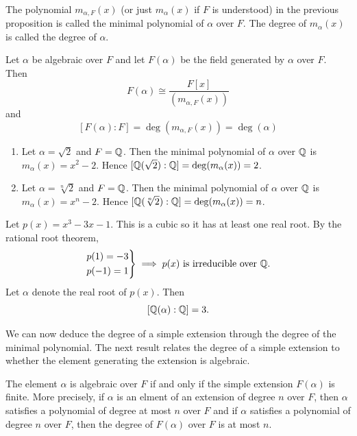 \begin{definition} \leavevmode \\
    The polynomial $m_{\alpha, F}(x)$ (or just $m_\alpha(x)$ if $F$ is understood) in the previous proposition is called the minimal polynomial of $\alpha$ over $F$. The degree of $m_\alpha (x)$ is called the degree of $\alpha$.
\end{definition}

\begin{proposition}
    Let $\alpha$ be algebraic over $F$ and let $F(\alpha)$ be the field generated by $\alpha$ over $F$. Then
    $$F(\alpha) \cong \frac{F[x]}{(m_{\alpha, F}(x))}$$
    and
    $$[F(\alpha) : F] = \deg (m_{\alpha, F}(x)) = \deg (\alpha)$$
\end{proposition}

\begin{example}
    \begin{enumerate}
        \item Let $\alpha = \sqrt{2}$ and $F = \mathbb{Q}$. Then the minimal polynomial of $\alpha$ over $\mathbb{Q}$ is $m_\alpha(x) = x^2 - 2$. Hence $[\mathbb{Q}(\sqrt{2}) : \mathbb{Q}] = \deg (m_\alpha(x)) = 2$.
        \item Let $\alpha = \sqrt[n]{2}$ and $F = \mathbb{Q}$. Then the minimal polynomial of $\alpha$ over $\mathbb{Q}$ is $m_\alpha(x) = x^n - 2$. Hence $[\mathbb{Q}(\sqrt[n]{2}) : \mathbb{Q}] = \deg (m_\alpha(x)) = n$.
    \end{enumerate}
\end{example}

\begin{example}
    Let $p(x) = x^3-3x-1$. This is a cubic so it has at least one real root. By the rational root theorem,
    $$
    \begin{rcases*}
        p(1) = -3 \\
        p(-1) = 1
    \end{rcases*} \implies \text{$p(x)$ is irreducible over $\mathbb{Q}$.}
    $$
    Let $\alpha$ denote the real root of $p(x)$. Then
    $$[\mathbb{Q}(\alpha) : \mathbb{Q}] = 3.$$
\end{example}

We can now deduce the degree of a simple extension through the degree of the minimal polynomial. The next result relates the degree of a simple extension to whether the element generating the extension is algebraic.

\begin{proposition}
    The element $\alpha$ is algebraic over $F$ if and only if the simple extension $F(\alpha)$ is finite. More precisely, if $\alpha$ is an elment of an extension of degree $n$ over $F$, then $\alpha$ satisfies a polynomial of degree at most $n$ over $F$ and if $\alpha$ satisfies a polynomial of degree $n$ over $F$, then the degree of $F(\alpha)$ over $F$ is at most $n$.
\end{proposition}

